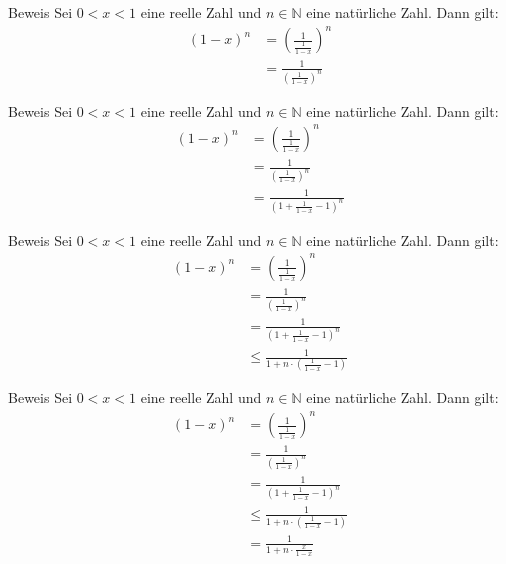 \documentclass[10pt]{beamer}
\def\bN{\mathbb{N}}
\begin{document}
\begin{frame}{Beweis}
    Sei \( 0 < x < 1 \) eine reelle Zahl und \( n \in \bN \) eine natürliche Zahl. Dann gilt:
    \begin{align*}
        \left( 1 - x \right)^{n}
        & = \left( \frac{1}{\frac{1}{1 - x}} \right)^{n} \\
        & = \frac{1}{\left( \frac{1}{1 - x} \right)^{n}}
    \end{align*}
\end{frame}



\begin{frame}{Beweis}
    Sei \( 0 < x < 1 \) eine reelle Zahl und \( n \in \bN \) eine natürliche Zahl. Dann gilt:
    \begin{align*}
        \left( 1 - x \right)^{n} 
        & = \left( \frac{1}{\frac{1}{1 - x}} \right)^{n} \\
        & = \frac{1}{\left( \frac{1}{1 - x} \right)^{n}} \\
        & = \frac{1}{\left( 1 + \frac{1}{1 - x} - 1 \right)^{n}}
    \end{align*}
\end{frame}



\begin{frame}{Beweis}
    Sei \( 0 < x < 1 \) eine reelle Zahl und \( n \in \bN \) eine natürliche Zahl. Dann gilt:
    \begin{align*}
        \left( 1 - x \right)^{n} 
        & = \left( \frac{1}{\frac{1}{1 - x}} \right)^{n} \\
        & = \frac{1}{\left( \frac{1}{1 - x} \right)^{n}} \\
        & = \frac{1}{\left( 1 + \frac{1}{1 - x} - 1 \right)^{n}} \\
        & \leq \frac{1}{1 + n \cdot \left( \frac{1}{1 - x} - 1 \right)}
    \end{align*}
\end{frame}



\begin{frame}{Beweis}
    Sei \( 0 < x < 1 \) eine reelle Zahl und \( n \in \bN \) eine natürliche Zahl. Dann gilt:
    \begin{align*}
        \left( 1 - x \right)^{n} 
        & = \left( \frac{1}{\frac{1}{1 - x}} \right)^{n} \\
        & = \frac{1}{\left( \frac{1}{1 - x} \right)^{n}} \\
        & = \frac{1}{\left( 1 + \frac{1}{1 - x} - 1 \right)^{n}} \\
        & \leq \frac{1}{1 + n \cdot \left( \frac{1}{1 - x} - 1 \right)} \\
        & = \frac{1}{1 + n \cdot \frac{x}{1 - x}}
    \end{align*}
\end{frame}
\end{document}
